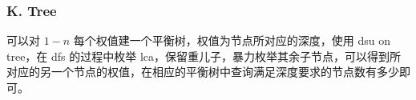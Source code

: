 \renewcommand{\problemname}{K. Tree}

\begin{frame}\frametitle{\problemname}

    可以对 $1-n$ 每个权值建一个平衡树，权值为节点所对应的深度，\pause 使用 dsu on tree，在 dfs 的过程中枚举 lca\pause ，保留重儿子，暴力枚举其余子节点，可以得到所对应的另一个节点的权值\pause ，在相应的平衡树中查询满足深度要求的节点数有多少即可。

\end{frame}

